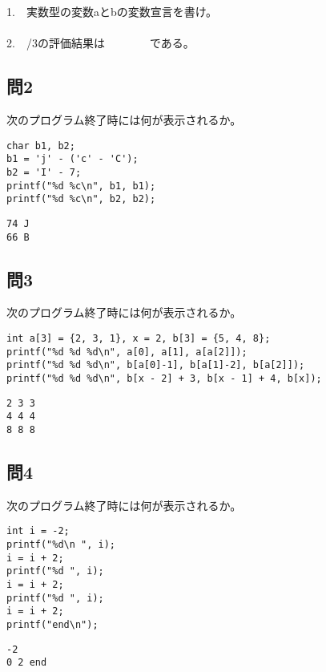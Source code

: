 \documentclass[a4j]{jarticle}
\begin{document}
\begin{multicols*}{2}
1.　実数型の変数{\ttfamily a}と{\ttfamily b}の変数宣言を書け。\\
\\

2.　{/3}の評価結果は　　　　である。





\subsection*{問2}

次のプログラム終了時には何が表示されるか。
\begin{verbatim}
char b1, b2;
b1 = 'j' - ('c' - 'C');
b2 = 'I' - 7;
printf("%d %c\n", b1, b1);
printf("%d %c\n", b2, b2);
\end{verbatim}

\ifnum {}
\vspace*{2cm}
\else
\begin{verbatim}
74 J
66 B
\end{verbatim}
\fi


\subsection*{問3}

次のプログラム終了時には何が表示されるか。
\begin{verbatim}
int a[3] = {2, 3, 1}, x = 2, b[3] = {5, 4, 8};
printf("%d %d %d\n", a[0], a[1], a[a[2]]);
printf("%d %d %d\n", b[a[0]-1], b[a[1]-2], b[a[2]]);
printf("%d %d %d\n", b[x - 2] + 3, b[x - 1] + 4, b[x]);
\end{verbatim}

\ifnum {}
\vspace*{2cm}
\else
\begin{verbatim}
2 3 3
4 4 4
8 8 8
\end{verbatim}
\fi



\subsection*{問4}

次のプログラム終了時には何が表示されるか。
\begin{verbatim}
int i = -2;
printf("%d\n ", i);
i = i + 2;
printf("%d ", i);
i = i + 2;
printf("%d ", i);
i = i + 2;
printf("end\n");
\end{verbatim}


\ifnum {}
\vspace{2cm}
\else
\begin{verbatim}
-2
0 2 end
\end{verbatim}
\fi







\end{multicols*}
\end{document}
